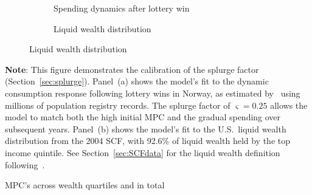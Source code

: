 \documentclass[qe,draft]{econsocart}
\theoremstyle{plain}
\theoremstyle{definition}
\begin{document}
\begin{figure}[H]
  \centering
  \caption{\pregenmark Model fit to spending behavior and wealth distribution}
  \label{fig:splurge_estimation} %
  \noindent\begin{minipage}{\textwidth}
    \centering
    \begin{subfigure}[b]{.48\linewidth}
      \centering
      \caption{Spending dynamics after lottery win}
      \label{fig:aggmpclotterywin} %
    \end{subfigure}
    \hfill
    \begin{subfigure}[b]{.48\linewidth}
      \centering
      \caption{Liquid wealth distribution}
      \label{fig:liquwealthdistribution} %
    \end{subfigure}
  \end{minipage}
\end{figure}
\noindent\parbox{\textwidth}{\footnotesize
  \textbf{Note}: This figure demonstrates the calibration of the splurge factor (Section~\ref{sec:splurge}).
  Panel~(a) shows the model's fit to the dynamic consumption response following lottery wins in Norway,
  as estimated by~\cite{fagereng-mpc-2021} using millions of population registry records.
  The splurge factor of $\varsigma = 0.25$ allows the model to match both the high initial MPC
  and the gradual spending over subsequent years.
  Panel~(b) shows the model's fit to the U.S.\ liquid wealth distribution from the 2004 SCF,
  with 92.6\% of liquid wealth held by the top income quintile.
  See Section~\ref{sec:SCFdata} for the liquid wealth definition following~\cite{kaplan2014model}.
}

\vspace{0.5em}  


\begin{table}[tb] 
  \caption{\pregenmark MPC's across wealth quartiles and in total}
  \label{tab:MPC-WQ} %
  \centering

  \setlength{\fboxrule}{0pt}
  \vspace{0.5em}

\end{table}
\end{document}

